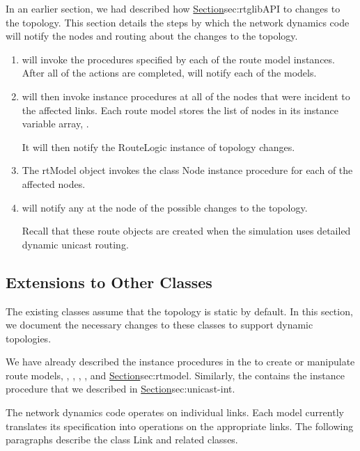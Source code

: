 In an earlier section,
we had described how
\href{unicast routing reacts}{Section}{sec:rtglibAPI}
to changes to the topology.
This section details the steps by which 
the network dynamics code will notify the nodes and routing
about the changes to the topology.
\begin{enumerate}
\item {} will invoke the procedures
  specified by each of the route model instances.
  After all of the actions are completed,
   will notify each of the models.
\item
  will then invoke instance procedures at all of the nodes
  that were incident to the affected links.
  Each route model stores the list of nodes in its instance variable
  array, .

  It will then notify the RouteLogic instance of topology changes.
\item
  The rtModel object invokes the class Node instance procedure
  for each of the affected nodes.
\item
   will notify any 
  at the node of the possible changes to the topology.

  Recall that these route objects are created when the simulation uses
  detailed dynamic unicast routing.
\end{enumerate}

\subsection{Extensions to Other Classes}
\label{sec:nd-extensions}

The existing classes assume that the topology is static by default.
In this section, we document the necessary changes to these
classes to support dynamic topologies.

We have already described the instance procedures
in the  to create or manipulate
route models, \ie,
, , , and
 \href{in earlier sections}{Section}{sec:rtmodel}.
Similarly, the 
contains the instance procedure 
that we described in \href{the previous section}{Section}{sec:unicast-int}.

The network dynamics code operates on individual links.
Each model currently translates its specification into
operations on the appropriate links.
The following paragraphs describe the class Link and related classes.

